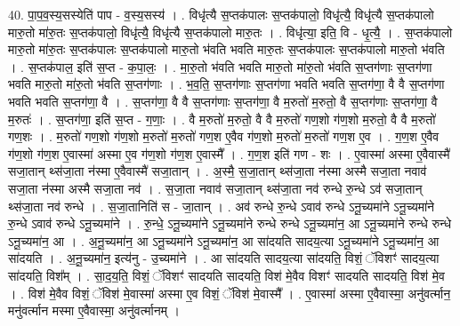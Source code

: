 \documentclass[17pt]{extarticle}
\begin{document}
40. पा॒प॒व॒स्य॒सस्येति॑ पाप - व॒स्य॒सस्य॑ । . विधृ॑त्यै स॒प्तक॑पालः स॒प्तक॑पालो॒ विधृ॑त्यै॒ विधृ॑त्यै स॒प्तक॑पालो मारु॒तो मा॑रु॒तः स॒प्तक॑पालो॒ विधृ॑त्यै॒ विधृ॑त्यै स॒प्तक॑पालो मारु॒तः । . विधृ॑त्या॒ इति॒ वि - धृ॒त्यै॒ । . स॒प्तक॑पालो मारु॒तो मा॑रु॒तः स॒प्तक॑पालः स॒प्तक॑पालो मारु॒तो भ॑वति भवति मारु॒तः स॒प्तक॑पालः स॒प्तक॑पालो मारु॒तो भ॑वति । . स॒प्तक॑पाल॒ इति॑ स॒प्त - क॒पा॒लः॒ । . मा॒रु॒तो भ॑वति भवति मारु॒तो मा॑रु॒तो भ॑वति स॒प्तग॑णाः स॒प्तग॑णा भवति मारु॒तो मा॑रु॒तो भ॑वति स॒प्तग॑णाः । . भ॒व॒ति॒ स॒प्तग॑णाः स॒प्तग॑णा भवति भवति स॒प्तग॑णा॒ वै वै स॒प्तग॑णा भवति भवति स॒प्तग॑णा॒ वै । . स॒प्तग॑णा॒ वै वै स॒प्तग॑णाः स॒प्तग॑णा॒ वै म॒रुतो॑ म॒रुतो॒ वै स॒प्तग॑णाः स॒प्तग॑णा॒ वै म॒रुतः॑ । . स॒प्तग॑णा॒ इति॑ स॒प्त - ग॒णाः॒ । . वै म॒रुतो॑ म॒रुतो॒ वै वै म॒रुतो॑ गण॒शो ग॑ण॒शो म॒रुतो॒ वै वै म॒रुतो॑ गण॒शः । . म॒रुतो॑ गण॒शो ग॑ण॒शो म॒रुतो॑ म॒रुतो॑ गण॒श ए॒वैव ग॑ण॒शो म॒रुतो॑ म॒रुतो॑ गण॒श ए॒व । . ग॒ण॒श ए॒वैव ग॑ण॒शो ग॑ण॒श ए॒वास्मा॑ अस्मा ए॒व ग॑ण॒शो ग॑ण॒श ए॒वास्मै᳚ । . ग॒ण॒श इति॑ गण - शः । . ए॒वास्मा॑ अस्मा ए॒वैवास्मै॑ सजा॒तान् थ्स॑जा॒ता न॑स्मा ए॒वैवास्मै॑ सजा॒तान् । . अ॒स्मै॒ स॒जा॒तान् थ्स॑जा॒ता न॑स्मा अस्मै सजा॒ता नवाव॑ सजा॒ता न॑स्मा अस्मै सजा॒ता नव॑ । . स॒जा॒ता नवाव॑ सजा॒तान् थ्स॑जा॒ता नव॑ रुन्धे रु॒न्धे ऽव॑ सजा॒तान् थ्स॑जा॒ता नव॑ रुन्धे । . स॒जा॒तानिति॑ स - जा॒तान् । . अव॑ रुन्धे रु॒न्धे ऽवाव॑ रुन्धे ऽनू॒च्यमा॑ने ऽनू॒च्यमा॑ने रु॒न्धे ऽवाव॑ रुन्धे ऽनू॒च्यमा॑ने । . रु॒न्धे॒ ऽनू॒च्यमा॑ने ऽनू॒च्यमा॑ने रुन्धे रुन्धे ऽनू॒च्यमा॑न॒ आ ऽनू॒च्यमा॑ने रुन्धे रुन्धे ऽनू॒च्यमा॑न॒ आ । . अ॒नू॒च्यमा॑न॒ आ ऽनू॒च्यमा॑ने ऽनू॒च्यमा॑न॒ आ सा॑दयति सादय॒त्या ऽनू॒च्यमा॑ने ऽनू॒च्यमा॑न॒ आ सा॑दयति । . अ॒नू॒च्यमा॑न॒ इत्य॑नु - उ॒च्यमा॑ने । . आ सा॑दयति सादय॒त्या सा॑दयति॒ विशं॒ ॅविशꣳ॑ सादय॒त्या सा॑दयति॒ विश᳚म् । . सा॒द॒य॒ति॒ विशं॒ ॅविशꣳ॑ सादयति सादयति॒ विश॑ मे॒वैव विशꣳ॑ सादयति सादयति॒ विश॑ मे॒व । . विश॑ मे॒वैव विशं॒ ॅविश॑ मे॒वास्मा॑ अस्मा ए॒व विशं॒ ॅविश॑ मे॒वास्मै᳚ । . ए॒वास्मा॑ अस्मा ए॒वैवास्मा॒ अनु॑वर्त्मान॒ मनु॑वर्त्मान मस्मा ए॒वैवास्मा॒ अनु॑वर्त्मानम् । \newline
\pagebreak
{}
\end{document}
